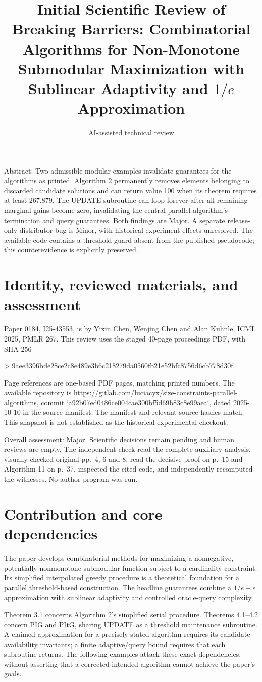\documentclass[10pt]{article}
\title{Initial Scientific Review of
Breaking Barriers: Combinatorial Algorithms for Non-Monotone Submodular Maximization with Sublinear Adaptivity and \(1/e\) Approximation}
\author{AI-assisted technical review}
\date{}
\begin{document}
\maketitle
Abstract: Two admissible modular examples invalidate guarantees for the algorithms as printed. Algorithm 2 permanently removes elements belonging to discarded candidate solutions and can return value 100 when its theorem requires at least 267.879. The UPDATE subroutine can loop forever after all remaining marginal gains become zero, invalidating the central parallel algorithm’s termination and query guarantees. Both findings are Major. A separate release-only distributor bug is Minor, with historical experiment effects unresolved. The available code contains a threshold guard absent from the published pseudocode; this counterevidence is explicitly preserved.\par
\section*{Identity, reviewed materials, and assessment}
Paper 0184, I25-43553, is by Yixin Chen, Wenjing Chen and Alan Kuhnle, ICML 2025, PMLR 267. This review uses the staged 40-page proceedings PDF, with SHA-256\par
> 9aee3396bde28ce2c8e489e3b6c218279da0560fb21e52bfc8756d6cb778d30f.\par
Page references are one-based PDF pages, matching printed numbers. The available repository is https://gitlab.com/luciacyx/size-constraints-parallel-algorithms, commit `a92b07ed0486ce004cae300bf5d69b83c8e99aea`, dated 2025-10-10 in the source manifest. The manifest and relevant source hashes match. This snapshot is not established as the historical experimental checkout.\par
Overall assessment: Major. Scientific decisions remain pending and human reviews are empty. The independent check read the complete auxiliary analysis, visually checked original pp. 4, 6 and 8, read the decisive proof on p. 15 and Algorithm 11 on p. 37, inspected the cited code, and independently recomputed the witnesses. No author program was run.\par
\section*{Contribution and core dependencies}
The paper develops combinatorial methods for maximizing a nonnegative, potentially nonmonotone submodular function subject to a cardinality constraint. Its simplified interpolated greedy procedure is a theoretical foundation for a parallel threshold-based construction. The headline guarantees combine a \(1/e-\epsilon\) approximation with sublinear adaptivity and controlled oracle-query complexity.\par
Theorem 3.1 concerns Algorithm 2’s simplified serial procedure. Theorems 4.1–4.2 concern PIG and PItG, sharing UPDATE as a threshold maintenance subroutine. A claimed approximation for a precisely stated algorithm requires its candidate availability invariants; a finite adaptive/query bound requires that each subroutine returns. The following examples attack these exact dependencies, without asserting that a corrected intended algorithm cannot achieve the paper’s goals.\par
\end{document}
